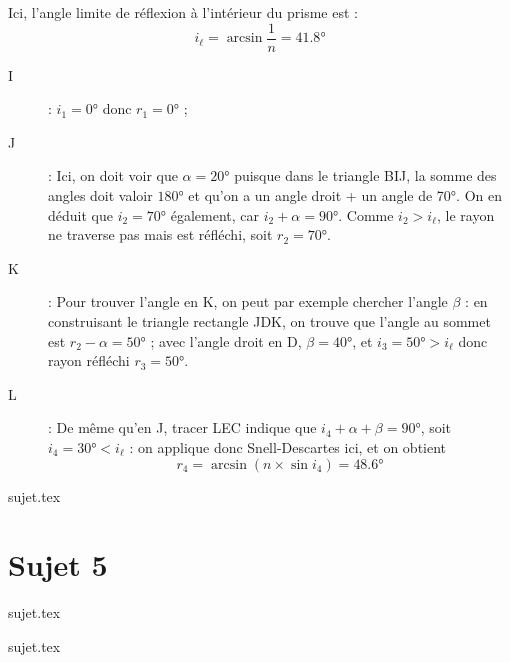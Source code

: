\documentclass[a4paper, 10pt]{book}
\begin{document}
{\begin{tcb}[sidebyside]
		Ici, l'angle limite de réflexion à l'intérieur du prisme est : \[i_\ell =
			\arcsin \frac{1}{n} = \boxed{ \ang{41.8;;}}\]
		\begin{description}
			\item[I] : $\boxed{i_1 = \ang{0;;}}$ donc
				$\boxed{r_1 = \ang{0;;}}$ ;
			\item[J] : Ici, on doit voir que $\alpha = \ang{20;;}$ puisque
				dans le triangle BIJ, la somme des angles doit valoir $\ang{180;;}$
				et qu'on a un angle droit + un angle de \ang{70;;}.
				On en déduit que $\boxed{i_2 = \ang{70;;}}$ également, car
				$i_2 + \alpha = \ang{90;;}$.\smallbreak
				Comme \underline{$i_2 > i_\ell$}, le rayon ne traverse pas mais est
				réfléchi, soit $\boxed{r_2 = \ang{70;;}}$.
		\end{description}
		\tcblower
		\begin{description}
			\item[K] : Pour trouver l'angle en K, on peut par exemple chercher
				l'angle $\beta$ : en construisant le triangle rectangle JDK, on
				trouve que l'angle au sommet est $r_2 - \alpha = \ang{50;;}$ ;
				avec l'angle droit en D, $\beta = \ang{40;;}$, et $\boxed{i_3
						= \ang{50;;} > i_\ell}$ donc rayon réfléchi $\boxed{r_3 =
						\ang{50;;}}$.
			\item[L] : De même qu'en J, tracer LEC indique que $i_4 + \alpha + \beta
					= \ang{90;;}$, soit $\boxed{i_4 = \ang{30;;} < i_\ell}$
				: on applique donc Snell-Descartes ici, et on obtient
				\[\boxed{r_4} = \arcsin (n\times \sin i_4) =
					\boxed{\ang{48.6;;}}\]
		\end{description}
	\end{tcb}
}

\resetQ
{sujet.tex}

\newpage

\chapter{Sujet 5}

\resetQ
{sujet.tex}

\resetQ
{sujet.tex}
\end{document}
